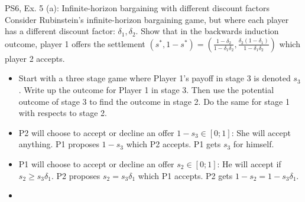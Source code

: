 \begin{frame}{PS6, Ex. 5 (a): Infinite-horizon bargaining with different discount factors}
    Consider Rubinstein's infinite-horizon bargaining game, but where each player has a different discount factor: $\delta_1,\delta_2$. Show that in the backwards induction outcome, player 1 offers the settlement
    $(s^{*},1-s^{*})=\left( \frac{1-\delta_2}{1-\delta_1\delta_2},\frac{\delta_2(1-\delta_1)}{1-\delta_1\delta_2}\right)$
    which player 2 accepts.
    \begin{itemize}
      \item[(Step a)] Start with a three stage game where Player 1's payoff in stage 3 is denoted $s_3$. Write up the outcome for Player 1 in stage 3. Then use the potential outcome of stage 3 to find the outcome in stage 2. Do the same for stage 1 with respects to stage 2.
    \end{itemize}
    \begin{itemize}
        \item[Stage 3] P2 will choose to accept or decline an offer $1-s_3\in [0;1]$: She will accept anything. P1 proposes $1-s_3$ which P2 accepts. P1 gets $s_3$ for himself.
        \item[Stage 2] P1 will choose to accept or decline an offer $s_2 \in [0;1]$: He will accept if $s_2 \geq s_3\delta_1$. P2 proposes $s_2 = s_3\delta_1$ which P1 accepts. P2 gets $1-s_2 = 1-s_3\delta_1$.
        \item[Stage 1]
    \end{itemize}
    \vfill\null
\end{frame}
